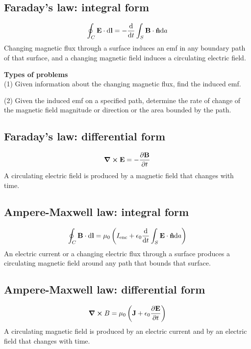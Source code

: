 \subsection*{Faraday's law: integral form}
\begin{equation*}
    \oint_C \mathbf{E} \cdot \differential \mathbf{l} = -\dv{t}\int_S \mathbf{B} \cdot \mathbf{\hat{n}} \differential a
\end{equation*}
Changing magnetic flux through a surface induces an emf in any boundary path of that surface, and a changing magnetic field induces a circulating electric field.

\textbf{Types of problems} \\
(1) Given information about the changing magnetic flux, find the induced emf.

(2) Given the induced emf on a specified path, determine the rate of change of the magnetic field magnitude or direction or the area bounded by the path.

\subsection*{Faraday's law: differential form}
\begin{equation*}
    \curl \mathbf{E} = - \pdv{\mathbf{B}}{t}
\end{equation*}
A circulating electric field is produced by a magnetic field that changes with time.

\subsection*{Ampere-Maxwell law: integral form}
\begin{equation*}
    \oint_C \mathbf{B} \cdot \differential \mathbf{l} = \mu_0 \left(I_{\textrm{enc}} + \epsilon_0 \dv{t}\int_S \mathbf{E} \cdot \mathbf{\hat{n}} \differential a\right)
\end{equation*}
An electric current or a changing electric flux through a surface produces a circulating magnetic field around any path that bounds that surface.

\subsection*{Ampere-Maxwell law: differential form}
\begin{equation*}
    \curl B = \mu_0 \left(\mathbf{J} + \epsilon_0 \pdv{\mathbf{E}}{t}\right)
\end{equation*}
A circulating magnetic field is produced by an electric current and by an electric field that changes with time.

